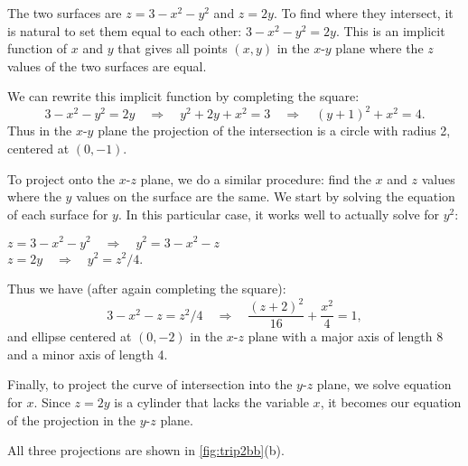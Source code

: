 {The two surfaces are $z=3-x^2-y^2$ and $z=2y$. To find where they intersect, it is natural to set them equal to each other: $3-x^2-y^2=2y$. This is an implicit function of $x$ and $y$ that gives all points $(x,y)$ in the $x$-$y$ plane where the $z$ values of the two surfaces are equal. 

We can rewrite this implicit function by completing the square:
$$3-x^2-y^2=2y \quad \Rightarrow \quad y^2+2y+x^2=3\quad \Rightarrow \quad (y+1)^2+x^2=4.$$ Thus in the $x$-$y$ plane the projection of the intersection is a circle with radius 2, centered at $(0,-1)$.

To project onto the $x$-$z$ plane, we do a similar procedure: find the $x$ and $z$ values where the $y$ values on the surface are the same. We start by solving the equation of each surface for $y$. In this particular case, it works well to actually solve for $y^2$:

\noindent $z=3-x^2-y^2 \quad \Rightarrow \quad y^2=3-x^2-z$\\
\noindent $z=2y \quad \Rightarrow \quad y^2=z^2/4$.

Thus we have (after again completing the square):
$$3-x^2-z = z^2/4 \quad \Rightarrow\quad \frac{(z+2)^2}{16}+\frac{x^2}4=1,$$
and ellipse centered at $(0,-2)$ in the $x$-$z$ plane with a major axis of length 8 and a minor axis of length 4. 

Finally, to project the curve of intersection into the $y$-$z$ plane, we solve equation for $x$. Since $z=2y$ is a cylinder that lacks the variable $x$, it becomes our equation of the projection in the $y$-$z$ plane.

All three projections are shown in \autoref{fig:trip2bb}(b).}

